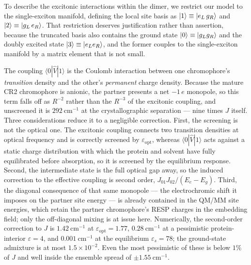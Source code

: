 \documentclass[journal=jpcbfk, manuscript=article, layout=twocolumn, doi=true]{achemso}
\begin{document}
To describe the excitonic interactions within the dimer, we restrict our model to the single-exciton manifold, defining the local site basis as $\ket{1}\equiv\ket{e_L \, g_R}$ and $\ket{2}\equiv\ket{g_L \, e_R}$. That restriction deserves justification rather than assertion, because the truncated basis also contains the ground state $\ket{0}\equiv\ket{g_L g_R}$ and the doubly excited state $\ket{3}\equiv\ket{e_L e_R}$, and the former couples to the single-exciton manifold by a matrix element that is not small.

The coupling $\langle 0|\hat V|1\rangle$ is the Coulomb interaction between one chromophore's \emph{transition} density and the other's \emph{permanent} charge density. Because the mature CR2 chromophore is anionic, the partner presents a net $-1\,e$ monopole, so this term falls off as $R^{-2}$ rather than the $R^{-3}$ of the excitonic coupling, and unscreened it is $292~\mathrm{cm^{-1}}$ at the crystallographic separation --- nine times $J$ itself. Three considerations reduce it to a negligible correction. First, the screening is not the optical one. The excitonic coupling connects two transition densities at optical frequency and is correctly screened by $\varepsilon_{\mathrm{opt}}$, whereas $\langle 0|\hat V|1\rangle$ acts against a static charge distribution with which the protein and solvent have fully equilibrated before absorption, so it is screened by the equilibrium response. Second, the intermediate state is the full optical gap away, so the induced correction to the effective coupling is second order, $J_{01}J_{02}/(E_e-E_g)$. Third, the diagonal consequence of that same monopole --- the electrochromic shift it imposes on the partner site energy --- is already contained in the QM/MM site energies, which retain the partner chromophore's RESP charges in the embedding field; only the off-diagonal mixing is at issue here. Numerically, the second-order correction to $J$ is $1.42~\mathrm{cm^{-1}}$ at $\varepsilon_{\mathrm{opt}} = 1.77$, $0.28~\mathrm{cm^{-1}}$ at a pessimistic protein-interior $\varepsilon = 4$, and $0.001~\mathrm{cm^{-1}}$ at the equilibrium $\varepsilon_s = 78$; the ground-state admixture is at most $1.5\times10^{-2}$. Even the most pessimistic of these is below $1\%$ of $J$ and well inside the ensemble spread of $\pm1.55~\mathrm{cm^{-1}}$.
\end{document}
